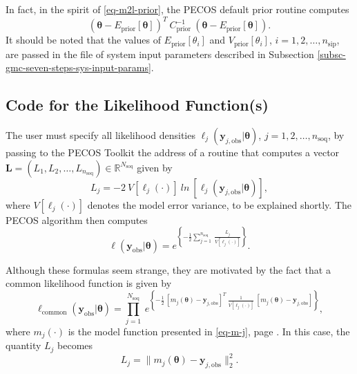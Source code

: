 In fact, in the spirit of \eqref{eq-m2l-prior}, the PECOS default prior routine computes
\begin{equation*}
(\boldsymbol{\theta}-E_{\text{prior}}[\boldsymbol{\theta}])^T
~C_{\text{prior}}^{-1}~
(\boldsymbol{\theta}-E_{\text{prior}}[\boldsymbol{\theta}]).
\end{equation*}
It should be noted that the values of $E_{\text{prior}}[\theta_i]$ and $V_{\text{prior}}[\theta_i]$, $i=1,2,\ldots,n_{\text{sip}}$,
are passed in the file of system input parameters described in Subsection \ref{subsc-gmc-seven-steps-sys-input-params}.

\subsection{Code for the Likelihood Function(s)}\label{subsc-gmc-seven-steps-likelihood-code}

The user must specify all likelihood densities $\ell_j(\mathbf{y}_{j,\text{obs}}|\boldsymbol{\theta})$, $j=1,2,\ldots,n_{\text{soq}}$,
by passing to the PECOS Toolkit the address of a routine that computes a vector $\mathbf{L}=(L_1,L_2,\ldots,L_{n_{\text{soq}}})\in\mathbb{R}^{N_{\text{soq}}}$  given by
\begin{equation}\label{eq-m2l-likelihood}
L_j = -2~V[\ell_j(\cdot)]~ln~
\left[
\ell_j(\mathbf{y}_{j,\text{obs}}|\boldsymbol{\theta})
\right],
\end{equation}
where
$V[\ell_j(\cdot)]$ denotes the model error variance, to be explained shortly.
The PECOS algorithm then computes
\begin{equation*}
\ell(\mathbf{y}_{\text{obs}}|\boldsymbol{\theta}) = e^
{
\left\{
-\frac{1}{2}\sum_{j=1}^{n_{\text{soq}}}~\frac{L_j}{V[\ell_j(\cdot)]}
\right\}
}.
\end{equation*}

Although these formulas seem strange, they are motivated by the fact that a common likelihood function is given by
\begin{equation*}
\ell_{\text{common}}(\mathbf{y}_{\text{obs}}|\boldsymbol{\theta}) =
\prod_{j=1}^{N_{\text{soq}}}~
e^
{
\left\{
-\frac{1}{2}~[m_j(\boldsymbol{\theta})-\mathbf{y}_{j,\text{obs}}]^T~\frac{1}{V[\ell_j(\cdot)]}~[m_j(\boldsymbol{\theta})-\mathbf{y}_{j,\text{obs}}]
\right\}
},
\end{equation*}
where
$m_j(\cdot)$ is the model function presented in \eqref{eq-m-j}, page \pageref{eq-m-j}.
In this case, the quantity $L_j$ becomes
\begin{equation}\label{eq-m2l-likelihood-2}
L_j = \|m_j(\boldsymbol{\theta})-\mathbf{y}_{j,\text{obs}}\|_2^2.
\end{equation}

